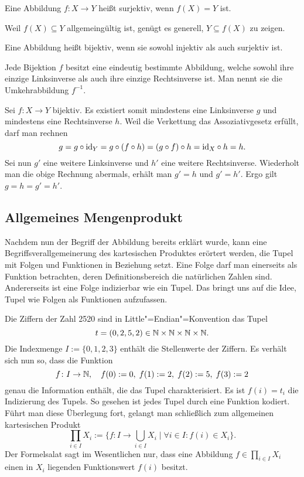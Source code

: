 \begin{Definition}[Surjektion]\label{def:surjektiv}\newlinefirst
Eine Abbildung $f\colon X\to Y$ heißt surjektiv,
wenn $f(X)=Y$ ist.
\end{Definition}

\noindent
Weil $f(X)\subseteq Y$ allgemeingültig ist, genügt es generell,
$Y\subseteq f(X)$ zu zeigen.

\begin{Definition}[Bijektion]\label{def:bijektiv}\newlinefirst
Eine Abbildung heißt bijektiv, wenn sie sowohl injektiv
als auch surjektiv ist.
\end{Definition}

\begin{Satz}
Jede Bijektion $f$ besitzt eine eindeutig bestimmte Abbildung, welche
sowohl ihre einzige Linksinverse als auch ihre einzige Rechtsinverse
ist. Man nennt sie die Umkehrabbildung $f^{-1}$.
\end{Satz}
\begin{Beweis}
Sei $f\colon X\to Y$ bijektiv. Es existiert somit mindestens eine
Linksinverse $g$ und mindestens eine Rechtsinverse $h$. Weil die
Verkettung das Assoziativgesetz erfüllt, darf man rechnen
\[g = g\circ\operatorname{id}_Y = g\circ (f\circ h) = (g\circ f)\circ h
= {\operatorname{id}_X}\circ h = h.\]
Sei nun $g'$ eine weitere Linksinverse und $h'$ eine weitere
Rechtsinverse. Wiederholt man die obige Rechnung abermals, erhält man
$g'=h$ und $g'=h'$. Ergo gilt $g = h = g' = h'$.\,\qedsymbol
\end{Beweis}

\subsection{Allgemeines Mengenprodukt}

Nachdem nun der Begriff der Abbildung bereits erklärt wurde, kann eine
Begriffsverallgemeinerung des kartesischen Produktes erörtert werden,
die Tupel mit Folgen und Funktionen in Beziehung setzt. Eine Folge
darf man einerseits als Funktion betrachten, deren Definitionsbereich
die natürlichen Zahlen sind. Andererseits ist eine Folge indizierbar wie
ein Tupel. Das bringt uns auf die Idee, Tupel wie Folgen als Funktionen
aufzufassen.

Die Ziffern der Zahl 2520 sind in Little"=Endian"=Konvention das Tupel
\[t=(0,2,5,2)\in\mathbb N\times\mathbb N\times\mathbb N\times\mathbb N.\]
Die Indexmenge $I:=\{0,1,2,3\}$ enthält die Stellenwerte der Ziffern.
Es verhält sich nun so, dass die Funktion
\[f\colon I\to\mathbb N,\quad f(0) := 0,\; f(1) := 2,\; f(2) := 5,\; f(3) := 2\]
genau die Information enthält, die das Tupel charakterisiert. Es ist
$f(i) = t_i$ die Indizierung des Tupels. So gesehen ist jedes Tupel durch
eine Funktion kodiert. Führt man diese Überlegung fort, gelangt man
schließlich zum allgemeinen kartesischen Produkt
\[\prod_{i\in I} X_i := \{f\colon I\to\bigcup_{i\in I} X_i\mid
\forall i\in I\colon f(i)\in X_i\}.\]
Der Formelsalat sagt im Wesentlichen nur, dass eine Abbildung
$f\in\prod_{i\in I} X_i$ einen in $X_i$ liegenden Funktionswert
$f(i)$ besitzt.


